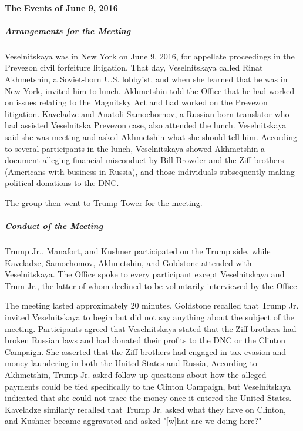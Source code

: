\paragraph{The Events of June 9, 2016}

\subparagraph{Arrangements for the Meeting}

Veselnitskaya was in New York on June 9, 2016, for appellate proceedings in the Prevezon civil forfeiture litigation.%
That day, Veselnitskaya called Rinat Akhmetshin, a Soviet-born U.S. lobbyist,
and when she learned that he was in New York, invited him to lunch.%
Akhmetshin told the Office that he had worked on issues relating to the Magnitsky Act and had worked on the Prevezon litigation.%
Kaveladze and Anatoli Samochornov, a Russian-born translator who had assisted Veselnitska Prevezon case, also attended the lunch.%
 Veselnitskaya said she was meeting  and asked Akhmetshin what she should tell him.%
According to several participants in the lunch, Veselnitskaya showed Akhmetshin a document alleging financial misconduct by Bill Browder and the Ziff brothers (Americans with business in Russia), and those individuals subsequently making political donations to the DNC.%

The group then went to Trump Tower for the meeting.%

\subparagraph{Conduct of the Meeting}

Trump Jr., Manafort, and Kushner participated on the Trump side, while Kaveladze, Samochomov, Akhmetshin, and Goldstone attended with Veselnitskaya.%
The Office spoke to every participant except Veselnitskaya and Trum Jr., the latter of whom declined to be voluntarily interviewed by the Office

The meeting lasted approximately 20 minutes.%
 Goldstone recalled that Trump Jr. invited Veselnitskaya to begin but did not say anything about the subject of the meeting.%
Participants agreed that Veselnitskaya stated that the Ziff brothers had broken Russian laws and had donated their profits to the DNC or the Clinton Campaign.%
She asserted that the Ziff brothers had engaged in tax evasion and money laundering in both the United States and Russia,%
According to Akhmetshin, Trump Jr. asked follow-up questions about how the alleged payments could be tied specifically to the Clinton Campaign, but Veselnitskaya indicated that she could not trace the money once it entered the United States.%
Kaveladze similarly recalled that Trump Jr. asked what they have on Clinton, and Kushner became aggravated and asked "[w]hat are we doing here?"%

